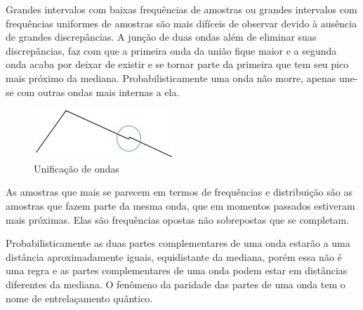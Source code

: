 Grandes intervalos com baixas frequências de amostras ou grandes intervalos com frequências uniformes de amostras são mais difíceis de observar devido à ausência de grandes discrepâncias. A junção de duas ondas além de eliminar suas discrepâncias, faz com que a primeira onda da união fique maior e a segunda onda acaba por deixar de existir e se tornar parte da primeira que tem seu pico mais próximo da mediana. Probabilisticamente uma onda não morre, apenas une-se com outras ondas mais internas a ela.
\begin{figure}[H]
\caption{Unificação de ondas}
\label{fig:consciousness_uniform_wave}
\centering
\includegraphics[scale=1]{sections/images/consciousness_uniform_wave.jpg}
\end{figure}

As amostras que mais se parecem em termos de frequências e distribuição são as amostras que fazem parte da mesma onda, que em momentos passados estiveram mais próximas. Elas são frequências opostas não sobrepostas que se completam.

Probabilisticamente as duas partes complementares de uma onda estarão a uma distância aproximadamente iguais, equidistante da mediana, porém essa não é uma regra e as partes complementares de uma onda podem estar em distâncias diferentes da mediana. O fenômeno da paridade das partes de uma onda tem o nome de entrelaçamento quântico.

